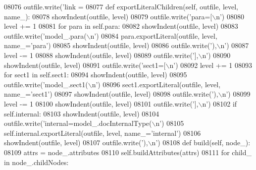 \begin{DoxyCode}
{{{{{{{{{{{{{{{{{{{{{{{{{{{{{{{{{{{{{{{{{{{{{{{{{{{{{{{{{{{{{{{{{{{{{{{{{{{{{{{{{{{{{{{{{{{{{{{{{{{{{{{{{{{{{{{{{{{{{{{{{{{{{{{{{{{{{{{{{{{{{{{{{{{{{{{{{{{{{{{{{{{{{{{{{{{{{{{{{{{{{{{{{{{{{{{{{{{{{{{{{{{{{{{{{{{{{{{{{{{{{{{{{{{{{{{{{{{{{{{{{{{{{{{{{{{{{{{{{{{{{{{{{{{{{{{{{{{{{{{{{{{{{{{{{{{{{{{{{{{{{{{{{{{{{{{{{{{{{{{{{{{{{{{{{{{{{{{{{{{{{{{{{{{{{{{{{{{{{{{{{{{{{{{{{{{{{{{{{{{{{{{{{{{{{{{{{{{{{{{{{{{{{{{{{{{{{{{{{{{{{{{{{{{{{{{{{{{{{{{{{{{{{{{{{{{{{{{{{{{{{{{{{{{{{{{{{{{{{{{{{{{{{{{{{{{{{{{08076             outfile.write(\textcolor{stringliteral}{'link = %
08077     \textcolor{keyword}{def }exportLiteralChildren(self, outfile, level, name\_):
08078         showIndent(outfile, level)
08079         outfile.write(\textcolor{stringliteral}{'para=[\(\backslash\)n'})
08080         level += 1
08081         \textcolor{keywordflow}{for} para \textcolor{keywordflow}{in} self.para:
08082             showIndent(outfile, level)
08083             outfile.write(\textcolor{stringliteral}{'model\_.para(\(\backslash\)n'})
08084             para.exportLiteral(outfile, level, name\_=\textcolor{stringliteral}{'para'})
08085             showIndent(outfile, level)
08086             outfile.write(\textcolor{stringliteral}{'),\(\backslash\)n'})
08087         level -= 1
08088         showIndent(outfile, level)
08089         outfile.write(\textcolor{stringliteral}{'],\(\backslash\)n'})
08090         showIndent(outfile, level)
08091         outfile.write(\textcolor{stringliteral}{'sect1=[\(\backslash\)n'})
08092         level += 1
08093         \textcolor{keywordflow}{for} sect1 \textcolor{keywordflow}{in} self.sect1:
08094             showIndent(outfile, level)
08095             outfile.write(\textcolor{stringliteral}{'model\_.sect1(\(\backslash\)n'})
08096             sect1.exportLiteral(outfile, level, name\_=\textcolor{stringliteral}{'sect1'})
08097             showIndent(outfile, level)
08098             outfile.write(\textcolor{stringliteral}{'),\(\backslash\)n'})
08099         level -= 1
08100         showIndent(outfile, level)
08101         outfile.write(\textcolor{stringliteral}{'],\(\backslash\)n'})
08102         \textcolor{keywordflow}{if} self.internal:
08103             showIndent(outfile, level)
08104             outfile.write(\textcolor{stringliteral}{'internal=model\_.docInternalType(\(\backslash\)n'})
08105             self.internal.exportLiteral(outfile, level, name\_=\textcolor{stringliteral}{'internal'})
08106             showIndent(outfile, level)
08107             outfile.write(\textcolor{stringliteral}{'),\(\backslash\)n'})
08108     \textcolor{keyword}{def }build(self, node\_):
08109         attrs = node\_.attributes
08110         self.buildAttributes(attrs)
08111         \textcolor{keywordflow}{for} child\_ \textcolor{keywordflow}{in} node\_.childNodes:
}}}}}}}}}}}}}}}}}}}}}}}}}}}}}}}}}}}}}}}}}}}}}}}}}}}}}}}}}}}}}}}}}}}}}}}}}}}}}}}}}}}}}}}}}}}}}}}}}}}}}}}}}}}}}}}}}}}}}}}}}}}}}}}}}}}}}}}}}}}}}}}}}}}}}}}}}}}}}}}}}}}}}}}}}}}}}}}}}}}}}}}}}}}}}}}}}}}}}}}}}}}}}}}}}}}}}}}}}}}}}}}}}}}}}}}}}}}}}}}}}}}}}}}}}}}}}}}}}}}}}}}}}}}}}}}}}}}}}}}}}}}}}}}}}}}}}}}}}}}}}}}}}}}}}}}}}}}}}}}}}}}}}}}}}}}}}}}}}}}}}}}}}}}}}}}}}}}}}}}}}}}}}}}}}}}}}}}}}}}}}}}}}}}}}}}}}}}}}}}}}}}}}}}}}}}}}}}}}}}}}}}}}}}}}}}}}}}}}}}}}}}}}}}}}}}}}}}}}}}}}}}}}}}}}}}}}}}}}}}}}}}}}}}}}}}}}}}}
\end{DoxyCode}
